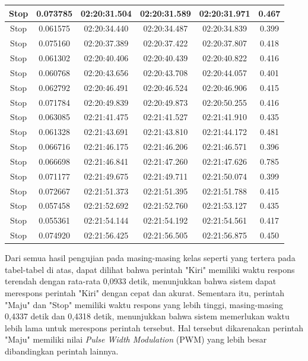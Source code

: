 \begin{longtable}{|c|c|c|c|c|c|}
      Stop & 0.073785 & 02:20:31.504 & 02:20:31.589 & 02:20:31.971 & 0.467 \\ \hline
      Stop & 0.061575 & 02:20:34.440 & 02:20:34.487 & 02:20:34.839 & 0.399 \\ \hline
      Stop & 0.075160 & 02:20:37.389 & 02:20:37.422 & 02:20:37.807 & 0.418 \\ \hline
      Stop & 0.061302 & 02:20:40.406 & 02:20:40.439 & 02:20:40.822 & 0.416 \\ \hline
      Stop & 0.060768 & 02:20:43.656 & 02:20:43.708 & 02:20:44.057 & 0.401 \\ \hline
      Stop & 0.062792 & 02:20:46.491 & 02:20:46.524 & 02:20:46.906 & 0.415 \\ \hline
      Stop & 0.071784 & 02:20:49.839 & 02:20:49.873 & 02:20:50.255 & 0.416 \\ \hline
      Stop & 0.063085 & 02:21:41.475 & 02:21:41.527 & 02:21:41.910 & 0.435 \\ \hline
      Stop & 0.061328 & 02:21:43.691 & 02:21:43.810 & 02:21:44.172 & 0.481 \\ \hline
      Stop & 0.066716 & 02:21:46.175 & 02:21:46.206 & 02:21:46.571 & 0.396 \\ \hline
      Stop & 0.066698 & 02:21:46.841 & 02:21:47.260 & 02:21:47.626 & 0.785 \\ \hline
      Stop & 0.071177 & 02:21:49.675 & 02:21:49.711 & 02:21:50.074 & 0.399 \\ \hline
      Stop & 0.072667 & 02:21:51.373 & 02:21:51.395 & 02:21:51.788 & 0.415 \\ \hline
      Stop & 0.057458 & 02:21:52.692 & 02:21:52.760 & 02:21:53.127 & 0.435 \\ \hline
      Stop & 0.055361 & 02:21:54.144 & 02:21:54.192 & 02:21:54.561 & 0.417 \\ \hline
      Stop & 0.074920 & 02:21:56.425 & 02:21:56.505 & 02:21:56.875 & 0.450 \\ \hline
\end{longtable}

Dari semua hasil pengujian pada masing-masing kelas seperti yang tertera pada tabel-tabel di atas, dapat dilihat bahwa perintah "Kiri" memiliki waktu respons terendah dengan rata-rata 0,0933 detik, menunjukkan bahwa sistem dapat merespons perintah "Kiri" dengan cepat dan akurat. Sementara itu, perintah "Maju" dan "Stop" memiliki waktu respons yang lebih tinggi, masing-masing 0,4337 detik dan 0,4318 detik, menunjukkan bahwa sistem memerlukan waktu lebih lama untuk merespons perintah tersebut. Hal tersebut dikarenakan perintah "Maju" memiliki nilai \emph{Pulse Width Modulation} (PWM) yang lebih besar dibandingkan perintah lainnya.

